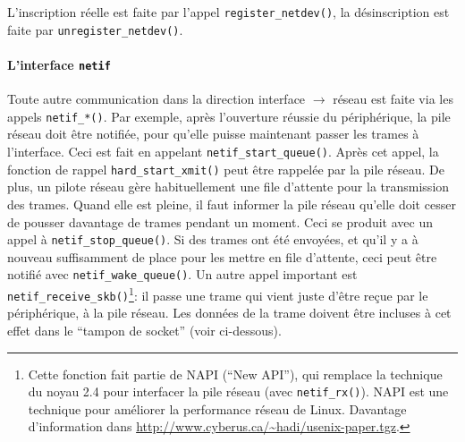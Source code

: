 \documentclass[a4paper,12pt,BCOR6mm,bibtotoc,idxtotoc]{scrbook}
\begin{document}
L'inscription r\'eelle est faite par l'appel \lstinline+register_netdev()+,
la d\'esinscription est faite par \lstinline+unregister_netdev()+.

\paragraph{L'interface \lstinline+netif+} Toute autre
communication dans la direction interface $\to$ r\'eseau est faite via
les appels \lstinline+netif_*()+. Par exemple, apr\`es l'ouverture
r\'eussie du p\'eriph\'erique, la pile r\'eseau doit \^etre
notifi\'ee, pour qu'elle puisse maintenant passer les trames \`a
l'interface.  Ceci est fait en appelant
\lstinline+netif_start_queue()+. Apr\`es cet appel, la fonction de
rappel \lstinline+hard_start_xmit()+ peut \^etre rappel\'ee par la
pile r\'eseau. De plus, un pilote r\'eseau g\`ere habituellement une
file d'attente pour la transmission des trames.  Quand elle est pleine,
il faut informer la pile r\'eseau qu'elle doit cesser de pousser
davantage de trames pendant un moment.  Ceci se produit avec un appel
\`a \lstinline+netif_stop_queue()+. Si des trames ont \'et\'e
envoy\'ees, et qu'il y a \`a nouveau suffisamment de place pour les
mettre en file d'attente, ceci peut \^etre notifi\'e avec
\lstinline+netif_wake_queue()+. Un autre appel important est
\lstinline+netif_receive_skb()+\footnote{Cette fonction fait partie de
NAPI (``New API''), qui remplace la technique du noyau 2.4 pour
interfacer la pile r\'eseau (avec \lstinline+netif_rx()+). NAPI est
une technique pour am\'eliorer la performance r\'eseau de
Linux. Davantage d'information dans
\url{http://www.cyberus.ca/~hadi/usenix-paper.tgz}.}: il passe une
trame qui vient juste d'\^etre re\c{c}ue par le p\'eriph\'erique, \`a
la pile r\'eseau.  Les donn\'ees de la trame doivent \^etre incluses
\`a cet effet dans le ``tampon de socket'' (voir ci-dessous).
\end{document}
